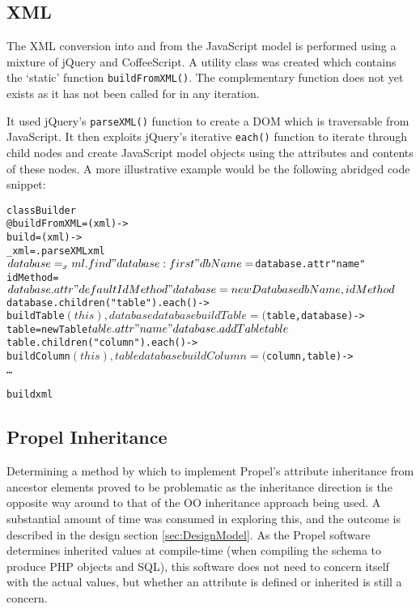 \subsection{XML}
The XML conversion into and from the Java\-Script model is performed using a mixture of jQuery and Coffee\-Script. A utility class was created which contains the `static' function \texttt{buildFromXML()}. The complementary function does not yet exists as it has not been called for in any iteration.

It used jQuery's \texttt{parseXML()} function to create a DOM which is traversable from Java\-Script. It then exploits jQuery's iterative \texttt{each()} function to iterate through child nodes and create Java\-Script model objects using the attributes and contents of these nodes. A more illustrative example would be the following abridged code snippet:
\begin{alltt}
class Builder
  @buildFromXML = (xml) ->
    build = (xml) ->
      _xml = $ $.parseXML xml
      $database = _xml.find "database:first"
      dbName    = $database.attr "name"
      idMethod  = $database.attr "defaultIdMethod"
      database  = new Database dbName, idMethod
      $database.children("table").each () ->
        buildTable $(this), database
      database

    buildTable = ($table, database) ->
      table = new Table $table.attr "name"
      database.addTable table
      $table.children("column").each () ->
        buildColumn $(this), table
      database

    buildColumn = ($column, table) ->
      \ldots

    build xml
\end{alltt}

\subsection{Propel Inheritance}
Determining a method by which to implement Propel's attribute inheritance from ancestor elements proved to be problematic as the inheritance direction is the opposite way around to that of the OO inheritance approach being used. A substantial amount of time was consumed in exploring this, and the outcome is described in the design section \ref{sec:DesignModel}. As the Propel software determines inherited values at compile-time (when compiling the schema to produce PHP objects and SQL), this software does not need to concern itself with the actual values, but whether an attribute is defined or inherited is still a concern.

